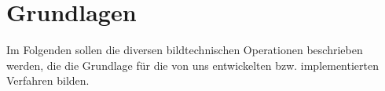 \chapter{Grundlagen}
\writtenby{\dcauthornameewie}%
Im Folgenden sollen die diversen bildtechnischen Operationen beschrieben werden, die die Grundlage für die von uns entwickelten bzw. implementierten Verfahren bilden.







